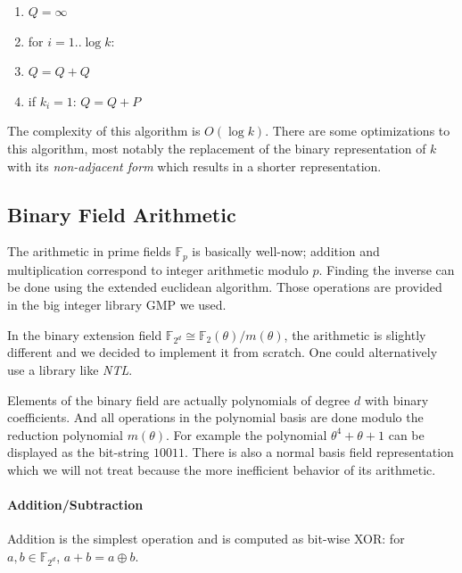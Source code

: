 \documentclass[11pt,english]{article}
\begin{document}
\begin{enumerate}
 \item $Q=\infty$
 \item for $i=1..\log{k}$:
 \item $Q=Q+Q$
 \item if $k_i=1$: $Q=Q+P$
\end{enumerate}

The complexity of this algorithm is $O(\log{k})$. There are some optimizations to this algorithm, most notably the replacement of the binary representation of $k$ with its \emph{non-adjacent form} which results in a shorter representation. 

\subsection{Binary Field Arithmetic}
The arithmetic in prime fields $\mathbb{F}_p$ is basically well-now; addition and multiplication correspond to integer arithmetic modulo $p$. Finding the inverse can be done using the extended euclidean algorithm. Those operations are provided in the big integer library GMP we used.

In the binary extension field $\mathbb{F}_{2^d}\cong \mathbb{F}_2(\theta)/m(\theta)$, the arithmetic is slightly different and we decided to implement it from scratch. One could alternatively use a library like \emph{NTL}.

Elements of the binary field are actually polynomials of degree $d$ with binary coefficients. And all operations in the polynomial basis are done modulo the reduction polynomial $m(\theta)$. For example the polynomial $\theta^4+\theta+1$ can be displayed as the bit-string $10011$. There is also a normal basis field representation which we will not treat because the more inefficient behavior of its arithmetic.

\paragraph{Addition/Subtraction}
Addition is the simplest operation and is computed as bit-wise XOR: for $a,b\in \mathbb{F}_{2^d}$, $a+b=a\oplus b$.
\end{document}
